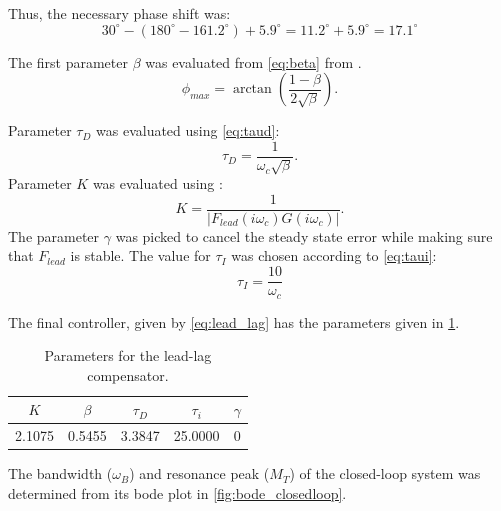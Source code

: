 \documentclass[a4paper]{article}
\begin{document}
Thus, the necessary phase shift was:
\[
	30^\circ - (180^\circ-161.2^\circ) + 5.9^\circ = 11.2^\circ + 5.9^\circ = 17.1^\circ
\]

The first parameter $\beta$ was evaluated from \cref{eq:beta} from \cite{basic_book}.
\begin{equation}
\phi_{max}=\arctan(\frac{1-\beta}{2\sqrt\beta}).
\label{eq:beta}
\end{equation}

Parameter $\tau_D$ was evaluated using \cref{eq:taud}:
\begin{equation}
\tau_D=\frac{1}{\omega_c\sqrt\beta}.
\label{eq:taud}
\end{equation}
Parameter $K$ was evaluated using :
\begin{equation}
K=\frac{1}{\lvert F_{lead}(i\omega_c)G(i\omega_c)\lvert}.
\label{eq:k}
\end{equation}
The parameter $\gamma$ was picked to cancel the steady state error while making sure that $F_{lead}$ is stable. The value for $\tau_I$ was chosen according to \cref{eq:taui}:
\begin{equation}
\tau_I=\frac{10}{\omega_c}
\label{eq:taui}
\end{equation}

The final controller, given by \cref{eq:lead_lag} has the parameters given in \cref{tb:lead_lag_parameters}.

\begin{table}[!ht]
\begin{center}
	\begin{tabular}{|c|c|c|c|c|}
		\hline
		$K$ & $\beta$ & $\tau_D$ & $\tau_i$ & $\gamma$\\
		\hline
		2.1075 & 0.5455 & 3.3847 & 25.0000 & 0\\
		\hline
	\end{tabular}
\end{center}
\caption{Parameters for the lead-lag compensator.}
\label{tb:lead_lag_parameters}
\end{table}

The bandwidth ($\omega_B$) and resonance peak ($M_T$) of the closed-loop system was determined from its bode plot in \cref{fig:bode_closedloop}.
\end{document}
